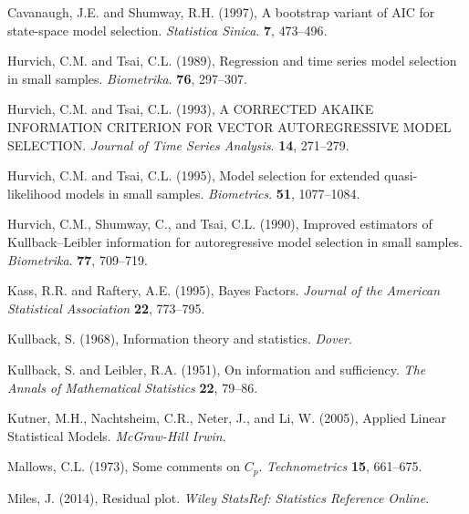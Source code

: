 \phantom{a}

\rff Cavanaugh, J.E. and Shumway, R.H. (1997),
      A bootstrap variant of AIC for state-space model selection.
      {\it Statistica Sinica}.
      {\bf 7}, {473--496}.

\phantom{a}

\rff Hurvich, C.M. and Tsai, C.L. (1989),
      Regression and time series model selection in small samples.
      {\it Biometrika}.
      {\bf 76}, {297--307}.

\phantom{a}

\rff Hurvich, C.M. and Tsai, C.L. (1993),
      A CORRECTED AKAIKE INFORMATION CRITERION FOR VECTOR AUTOREGRESSIVE MODEL SELECTION.
      {\it Journal of Time Series Analysis}.
      {\bf 14}, {271--279}.

\phantom{a}

\rff Hurvich, C.M. and Tsai, C.L. (1995),
      Model selection for extended quasi-likelihood models in small samples.
      {\it Biometrics}.
      {\bf 51}, {1077--1084}.

\phantom{a}

\rff Hurvich, C.M., Shumway, C., and Tsai, C.L. (1990),
      Improved estimators of Kullback–Leibler information for autoregressive model selection in small samples.
      {\it Biometrika}.
      {\bf 77}, {709--719}.

\phantom{a}

\rff Kass, R.R. and Raftery, A.E. (1995),
     Bayes Factors.
     {\it Journal of the American Statistical Association}
     {\bf 22}, {773--795}.

\phantom{a}

\rff Kullback, S. (1968),
      Information theory and statistics.
      {\it Dover}.

\phantom{a}

\rff Kullback, S. and Leibler, R.A. (1951),
     On information and sufficiency.
     {\it The Annals of Mathematical Statistics}
     {\bf 22}, {79--86}.

\phantom{a}

\rff Kutner, M.H., Nachtsheim, C.R., Neter, J., and Li, W. (2005),
      Applied Linear Statistical Models.
      {\it McGraw-Hill Irwin}.

\phantom{a}

\rff Mallows, C.L. (1973),
      Some comments on $C_p$.
      {\it Technometrics}
      {\bf 15}, {661--675}.

\phantom{a}

      \rff Miles, J. (2014),
      Residual plot.
      {\it Wiley StatsRef: Statistics Reference Online}.      

